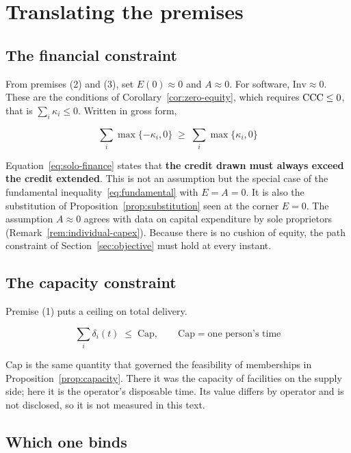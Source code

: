 \section{Translating the premises}

\subsection{The financial constraint}

From premises (2) and (3), set $E(0)\approx 0$ and $A\approx 0$. For software,
$\mathrm{Inv}\approx 0$. These are the conditions of Corollary~\ref{cor:zero-equity}, which
requires $\mathrm{CCC}\leq 0$, that is $\sum_i\kappa_i\leq 0$. Written in gross form,

\begin{equation}
\sum_{i} \max\{-\kappa_i,0\} \;\geq\; \sum_{i} \max\{\kappa_i,0\}
\label{eq:solo-finance}
\end{equation}

Equation~\eqref{eq:solo-finance} states that \textbf{the credit drawn must always exceed the
credit extended}. This is not an assumption but the special case of the fundamental
inequality~\eqref{eq:fundamental} with $E=A=0$. It is also the substitution of
Proposition~\ref{prop:substitution} seen at the corner $E=0$.
The assumption $A\approx 0$ agrees with data on capital expenditure by sole proprietors
(Remark~\ref{rem:individual-capex}). Because there is no cushion of equity, the path
constraint of Section~\ref{sec:objective} must hold at every instant.

\subsection{The capacity constraint}

Premise (1) puts a ceiling on total delivery.

\begin{equation}
\sum_{i} \delta_i(t) \;\leq\; \mathrm{Cap}, \qquad \mathrm{Cap} = \text{one person's time}
\label{eq:solo-capacity}
\end{equation}

$\mathrm{Cap}$ is the same quantity that governed the feasibility of memberships in
Proposition~\ref{prop:capacity}. There it was the capacity of facilities on the supply side;
here it is the operator's disposable time. Its value differs by operator and is not
disclosed, so it is not measured in this text.

\subsection{Which one binds}
\label{sec:which-binds}

